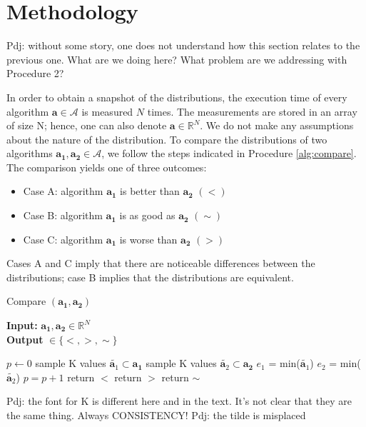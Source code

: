 \documentclass[conference]{IEEEtran}
\newcommand{\p}[1]{{\color{blue} Pdj: #1}}
\begin{document}
\section{Methodology}
\label{sec:met}
\p{without some story, one does not understand how this section relates to the previous one. What are we doing here?
  What problem are we addressing with Procedure 2?}
  
In order to obtain a snapshot of the distributions, the execution time of every algorithm $\mathbf{a} \in \mathcal{A}$ is
measured $N$ times. The measurements are stored in an array of size N; hence, one can also denote
$\mathbf{a} \in \mathbb{R}^N$. We do not make any assumptions about the nature of the distribution. To compare the
distributions of two algorithms $\mathbf{a_1},\mathbf{a_2} \in \mathcal{A}$, we follow the steps indicated in Procedure
\ref{alg:compare}.
%
The comparison yields one of three outcomes:
\begin{itemize}
\item Case A: algorithm $\mathbf{a_1}$ is better than $\mathbf{a_2}$ $(<)$
\item Case B: algorithm  $\mathbf{a_1}$ is as good as $\mathbf{a_2}$ $(\sim)$
\item Case C: algorithm  $\mathbf{a_1}$ is worse than $\mathbf{a_2}$ $(>)$
\end{itemize}
Cases A and C imply that there are noticeable differences between the distributions; case B implies that the distributions are equivalent.
\begin{algorithm}
	\caption{Compare $(\mathbf{a_1}, \mathbf{a_2})$ }
	\label{alg:compare}
	\hspace*{\algorithmicindent} \textbf{Input: } $ \mathbf{a_1}, \mathbf{a_2} \in \mathbb{R}^{N}$ \\
	\hspace*{\algorithmicindent} \textbf{Output } $\in  \{<,>,\sim \}$
	\begin{algorithmic}[1] 
		\State $p \leftarrow 0$
		\State sample K values $\tilde{\mathbf{a}_1} \subset \mathbf{a_1}$
		\State sample K values $\tilde{\mathbf{a}_2} \subset \mathbf{a_2}$
		\State $e_1$ = min($\tilde{\mathbf{a}_1}$)
		\State $e_2$ = min($\tilde{\mathbf{a}_2}$)
		\State $p=p+1$
		\EndIf
		\EndFor
		\State return $<$ 
		\State return $>$ 
		\Else
		\State return $\sim$ 
		\EndIf
	\end{algorithmic}
        \p{the font for K is different here and in the text. It's not clear that they  are the same thing. Always CONSISTENCY!}
        \p{the tilde is misplaced}
      \end{algorithm}
\end{document}
